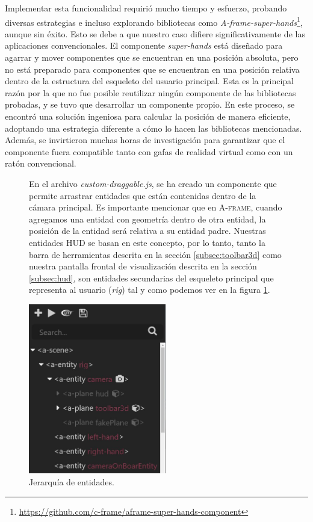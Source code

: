 \documentclass[a4paper, 11pt]{book}
\begin{document}
Implementar esta funcionalidad requirió mucho tiempo y esfuerzo, probando diversas estrategias e incluso explorando bibliotecas como \emph{A-frame-super-hands}\footnote{\url{https://github.com/c-frame/aframe-super-hands-component}}, aunque sin éxito. Esto se debe a que nuestro caso difiere significativamente de las aplicaciones convencionales.
El componente \emph{super-hands} está diseñado para agarrar y mover componentes que se encuentran en una posición absoluta, pero no está preparado para componentes que se encuentran en una posición relativa dentro de la estructura del esqueleto del usuario principal. Esta es la principal razón por la que no fue posible reutilizar ningún componente de las bibliotecas probadas, y se tuvo que desarrollar un componente propio. En este proceso, se encontró una solución ingeniosa para calcular la posición de manera eficiente, adoptando una estrategia diferente a cómo lo hacen las bibliotecas mencionadas. 
Además, se invirtieron muchas horas de investigación para garantizar que el componente fuera compatible tanto con gafas de realidad virtual como con un ratón convencional.\\
\begin{figure}[H]
  \begin{minipage}[b]{0.58\linewidth}
    En el archivo \emph{custom-draggable.js}, se ha creado un componente que permite arrastrar entidades que están contenidas dentro de la cámara principal. Es importante mencionar que en \textsc{A-frame}, cuando agregamos una entidad con geometría dentro de otra entidad, la posición de la entidad será relativa a su entidad padre. Nuestras entidades \textsc{\gls{HUD}} se basan en este concepto, por lo tanto, tanto la barra de herramientas descrita en la sección \ref{subsec:toolbar3d} como nuestra pantalla frontal de visualización descrita en la sección \ref{subsec:hud}, son entidades secundarias del esqueleto principal que representa al usuario (\emph{rig}) tal y como podemos ver en la figura \ref{fig:jerarquiaEntidadesRig}.
  \end{minipage}%
  \hfill
  \begin{minipage}[b]{0.4\linewidth}
    \centering
    \includegraphics[width=6cm, keepaspectratio]{img/jerarquiaRig.jpg}
    \caption{Jerarquía de entidades.}
    \label{fig:jerarquiaEntidadesRig}    
  \end{minipage}
\end{figure}
\end{document}
